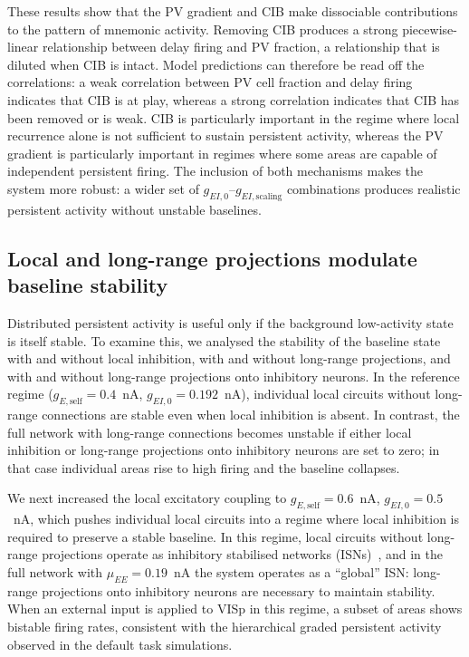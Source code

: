 \documentclass[11pt]{article}
\begin{document}
These results show that the PV gradient and CIB make dissociable contributions to the pattern of mnemonic activity. Removing CIB produces a strong piecewise-linear relationship between delay firing and PV fraction, a relationship that is diluted when CIB is intact. Model predictions can therefore be read off the correlations: a weak correlation between PV cell fraction and delay firing indicates that CIB is at play, whereas a strong correlation indicates that CIB has been removed or is weak. CIB is particularly important in the regime where local recurrence alone is not sufficient to sustain persistent activity, whereas the PV gradient is particularly important in regimes where some areas are capable of independent persistent firing. The inclusion of both mechanisms makes the system more robust: a wider set of $g_{EI,0}$--$g_{EI,\text{scaling}}$ combinations produces realistic persistent activity without unstable baselines.

\subsection{Local and long-range projections modulate baseline stability}

Distributed persistent activity is useful only if the background low-activity state is itself stable. To examine this, we analysed the stability of the baseline state with and without local inhibition, with and without long-range projections, and with and without long-range projections onto inhibitory neurons. In the reference regime ($g_{E,\text{self}}=0.4$~nA, $g_{EI,0}=0.192$~nA), individual local circuits without long-range connections are stable even when local inhibition is absent. In contrast, the full network with long-range connections becomes unstable if either local inhibition or long-range projections onto inhibitory neurons are set to zero; in that case individual areas rise to high firing and the baseline collapses.

We next increased the local excitatory coupling to $g_{E,\text{self}}=0.6$~nA, $g_{EI,0}=0.5$~nA, which pushes individual local circuits into a regime where local inhibition is required to preserve a stable baseline. In this regime, local circuits without long-range projections operate as inhibitory stabilised networks (ISNs)~\cite{tsodyks1997paradoxical,sanzeni2020inhibition}, and in the full network with $\mu_{EE}=0.19$~nA the system operates as a ``global'' ISN: long-range projections onto inhibitory neurons are necessary to maintain stability. When an external input is applied to VISp in this regime, a subset of areas shows bistable firing rates, consistent with the hierarchical graded persistent activity observed in the default task simulations.
\end{document}
